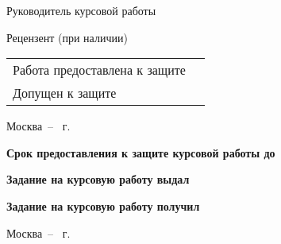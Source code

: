 \documentclass[14pt, a4paper, titlepage]{extarticle}
\begin{document}
\begin{titlepage}
    Руководитель курсовой работы  \hfill{} \bigskip\par
    Рецензент (при наличии)  \hfill{} \bigskip\par
    \begin{tabular}{@{}ll}
        Работа предоставлена к защите & \blankDate{}{} \bigskip\\
        Допущен к защите & \blankDate{}{}
    \end{tabular}
    \begin{center}
        \vfill Москва~-- \the\year{}~г.
    \end{center}
    \newpage
    \textbf{Срок предоставления к защите курсовой работы до} \hfill\blankDate{}{} \par
    \textbf{Задание на курсовую работу выдал}  \hfill{} \par
    \hfill\blankDate{}{} \par
    \textbf{Задание на курсовую работу получил}  \hfill{} \par\bigskip
    \begin{center}
        Москва~-- \the\year{}~г.
    \end{center}
\end{titlepage}
\addtocounter{page}{2}
\end{document}

